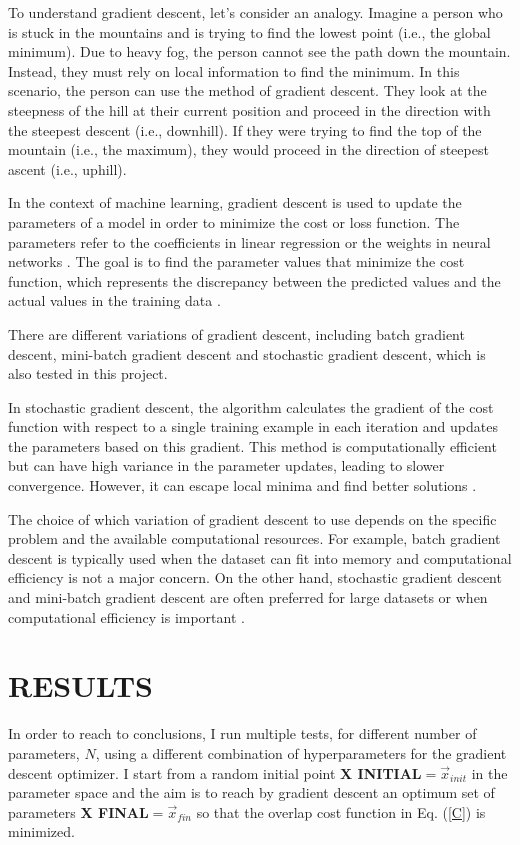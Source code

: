 \documentclass[inscr,ack,preface]{diphdthesis}
\begin{document}
To understand gradient descent, let's consider an analogy. Imagine a person who is stuck in the mountains and is trying to find the lowest point (i.e., the global minimum). Due to heavy fog, the person cannot see the path down the mountain. Instead, they must rely on local information to find the minimum. In this scenario, the person can use the method of gradient descent. They look at the steepness of the hill at their current position and proceed in the direction with the steepest descent (i.e., downhill). If they were trying to find the top of the mountain (i.e., the maximum), they would proceed in the direction of steepest ascent (i.e., uphill).

In the context of machine learning, gradient descent is used to update the parameters of a model in order to minimize the cost or loss function. The parameters refer to the coefficients in linear regression or the weights in neural networks \cite{gradient}. The goal is to find the parameter values that minimize the cost function, which represents the discrepancy between the predicted values and the actual values in the training data \cite{gd}.

There are different variations of gradient descent, including batch gradient descent, mini-batch gradient descent and stochastic gradient descent, which is also tested in this project.

In stochastic gradient descent, the algorithm calculates the gradient of the cost function with respect to a single training example in each iteration and updates the parameters based on this gradient. This method is computationally efficient but can have high variance in the parameter updates, leading to slower convergence. However, it can escape local minima and find better solutions \cite{gradient}.

The choice of which variation of gradient descent to use depends on the specific problem and the available computational resources. For example, batch gradient descent is typically used when the dataset can fit into memory and computational efficiency is not a major concern. On the other hand, stochastic gradient descent and mini-batch gradient descent are often preferred for large datasets or when computational efficiency is important \cite{gd}.

\chapter{RESULTS \label{results}}

In order to reach to conclusions, I run multiple tests, for different number of parameters, $N$, using a different combination of hyperparameters for the gradient descent optimizer. I start from a random initial point \textbf{X INITIAL}$=\vec{x}_{init}$ in the parameter space and the aim is to reach by gradient descent an optimum set of parameters \textbf{X FINAL}$=\vec{x}_{fin}$ so that the  overlap cost function in Eq. (\ref{C}) is minimized.
\end{document}
